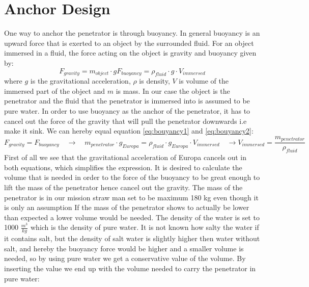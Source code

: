 \section{Anchor Design}
One way to anchor the penetrator is through buoyancy. In general buoyancy is an upward force that is exerted to an object by the surrounded fluid. For an object immersed in a fluid, the force acting on the object is gravity and buoyancy given by:
\begin{subequations}
\begin{equation}\label{eq:bouyancy1}
F_{gravity} = m_{object} \cdot g
\end{equation}
\begin{equation} \label{eq:bouyancy2}
F_{buoyancy} = \rho_{fluid}\cdot g \cdot V_{immersed} 
\end{equation}
\end{subequations}
where $g$ is the gravitational acceleration, $\rho$ is density, $V$ is volume of the immersed part of the object and $m$ is mass.  In our case the object is the penetrator and the fluid that the penetrator is immersed into is assumed to be pure water. In order to use buoyancy as the anchor of the penetrator, it has to cancel out the force of the gravity that will pull the penetrator downwards i.e make it sink. We can hereby equal equation \ref{eq:bouyancy1} and \ref{eq:bouyancy2}:
\begin{subequations}
\begin{equation*}\label{eq:bou1}
F_{gravity} = F_{buoyancy} \quad \rightarrow \quad m_{penetrator}\cdot g_{Europa} = \rho_{fluid}\cdot g_{Europa} \cdot V_{immersed}   \quad \rightarrow 
\end{equation*}
\begin{equation} \label{eq:bou2}
V_{immersed} = \frac{m_{penetrator}}{\rho_{fluid}}
\end{equation}
\end{subequations}
First of all we see that the gravitational acceleration of Europa cancels out in both equations, which simplifies the expression. It is desired to calculate the volume that is needed in order to the force of the buoyancy to be great enough to lift the mass of the penetrator hence cancel out the gravity. The mass of the penetrator is in our mission straw man set to be maximum 180 kg even though it is only an assumption  If the mass of the penetrator shows to actually be lower than expected a lower volume would be needed. The density of the water is set to 1000 $\frac{m^3}{kg}$ which is the density of pure water. It is not known how salty the water if it contains salt, but the density of salt water is slightly higher then water without salt, and hereby the buoyancy force would be higher and a smaller volume is needed, so by using pure water we get a conservative value of the volume. By inserting the value we end up with the volume needed to carry the penetrator in pure water:
